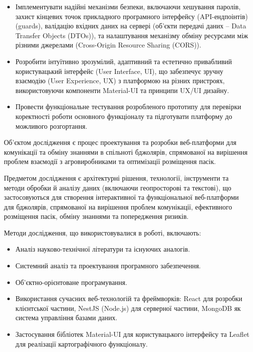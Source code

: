 \begin{itemize}
\begin{itemize}
        \end{itemize}
    \item Імплементувати надійні механізми безпеки, включаючи хешування паролів, захист кінцевих точок прикладного програмного інтерфейсу (API-ендпоінтів) (guards), валідацію вхідних даних на сервері (об'єкти передачі даних – Data Transfer Objects (DTOs)), та налаштування механізму обміну ресурсами між різними джерелами (Cross-Origin Resource Sharing (CORS)).
    \item Розробити інтуїтивно зрозумілий, адаптивний та естетично привабливий користувацький інтерфейс (User Interface, UI), що забезпечує зручну взаємодію (User Experience, UX) з платформою на різних пристроях, використовуючи компоненти Material-UI та принципи UX/UI дизайну.
    \item Провести функціональне тестування розробленого прототипу для перевірки коректності роботи основного функціоналу та підготувати платформу до можливого розгортання.
\end{itemize}

Об'єктом дослідження є процес проектування та розробки веб-платформи для комунікації та обміну знаннями в спільноті бджолярів, спрямованої на вирішення проблем взаємодії з агровиробниками та оптимізації розміщення пасік.

Предметом дослідження є архітектурні рішення, технології, інструменти та методи обробки й аналізу даних (включаючи геопросторові та текстові), що застосовуються для створення інтерактивної та функціональної веб-платформи для бджолярів, спрямованої на вирішення проблем комунікації, ефективного розміщення пасік, обміну знаннями та попередження ризиків.

Методи дослідження, що використовувалися в роботі, включають:
\begin{itemize}
    \item Аналіз науково-технічної літератури та існуючих аналогів.
    \item Системний аналіз та проектування програмного забезпечення.
    \item Об'єктно-орієнтоване програмування.
    \item Використання сучасних веб-технологій та фреймворків: React для розробки клієнтської частини, NestJS (Node.js) для серверної частини, MongoDB як система управління базами даних.
    \item Застосування бібліотек Material-UI для користувацького інтерфейсу та Leaflet для реалізації картографічного функціоналу.
\end{itemize}

